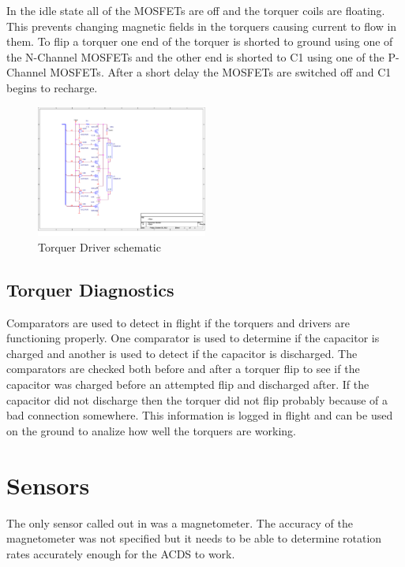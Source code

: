 In the idle state all of the \acp{MOSFET} are off and the torquer coils are floating. This prevents changing magnetic fields in the torquers causing current to flow in them. To flip a torquer one end of the torquer is shorted to ground using one of the N-Channel \acp{MOSFET} and the other end is shorted to C1 using one of the P-Channel \acp{MOSFET}. After a short delay the \acp{MOSFET} are switched off and C1 begins to recharge.

\begin{figure}[H]
    \centering
    \includegraphics[width=0.5\textwidth]{Figures/driverSchematic}
    \caption{Torquer Driver schematic}
    \label{fig:drive}
\end{figure}

\subsection{Torquer Diagnostics}

Comparators are used to detect in flight if the torquers and drivers are functioning properly. One comparator is used to determine if the capacitor is charged and another is used to detect if the capacitor is discharged. The comparators are checked both before and after a torquer flip to see if the capacitor was charged before an attempted flip and discharged after. If the capacitor did not discharge then the torquer did not flip probably because of a bad connection somewhere. This information is logged in flight and can be used on the ground to analize how well the torquers are working.



\section{Sensors}

The only sensor called out in \cite{Mentch11} was a magnetometer. The accuracy of the magnetometer was not specified but it needs to be able to determine rotation rates accurately enough for the \ac{ACDS} to work.

